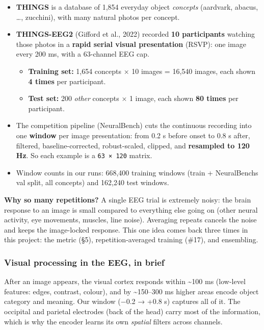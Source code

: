 \documentclass[
  11pt,
]{article}
\providecommand{\tightlist}{%
  \setlength{\itemsep}{0pt}\setlength{\parskip}{0pt}}
\renewcommand{\_}{\oldunderscore\allowbreak}
\begin{document}
\begin{itemize}
\tightlist
\item
  \textbf{THINGS} is a database of 1,854
  everyday object \emph{concepts}
  (aardvark, abacus, \ldots, zucchini),
  with many natural photos per concept.
\item
  \textbf{THINGS-EEG2} (Gifford et al.,
  2022) recorded \textbf{10
  participants} watching those photos in
  a \textbf{rapid serial visual
  presentation} (RSVP): one image every
  200 ms, with a 63-channel EEG cap.

  \begin{itemize}
  \tightlist
  \item
    \textbf{Training set:} 1,654
    concepts × 10 images = 16,540
    images, each shown \textbf{4 times}
    per participant.
  \item
    \textbf{Test set:} 200 \emph{other}
    concepts × 1 image, each shown
    \textbf{80 times} per participant.
  \end{itemize}
\item
  The competition pipeline (NeuralBench)
  cuts the continuous recording into one
  \textbf{window} per image
  presentation: from 0.2 s before onset
  to 0.8 s after, filtered,
  baseline-corrected, robust-scaled,
  clipped, and \textbf{resampled to 120
  Hz}. So each example is a
  \texttt{63\ ×\ 120} matrix.
\item
  Window counts in our runs: 668,400
  training windows (train +
  NeuralBench\textquotesingle s val
  split, all concepts) and 162,240 test
  windows.
\end{itemize}

\textbf{Why so many repetitions?} A
single EEG trial is extremely noisy: the
brain response to an image is small
compared to everything else going on
(other neural activity, eye movements,
muscles, line noise). Averaging repeats
cancels the noise and keeps the
image-locked response. This one idea
comes back three times in this project:
the metric (§5), repetition-averaged
training (\#17), and ensembling.

\subsubsection{Visual processing in the
EEG, in
brief}\label{visual-processing-in-the-eeg-in-brief}

After an image appears, the visual
cortex responds within
\textasciitilde100 ms (low-level
features: edges, contrast, colour), and
by \textasciitilde150--300 ms higher
areas encode object category and
meaning. Our window (−0.2 → +0.8 s)
captures all of it. The occipital and
parietal electrodes (back of the head)
carry most of the information, which is
why the encoder learns its own
\emph{spatial} filters across channels.
\end{document}
